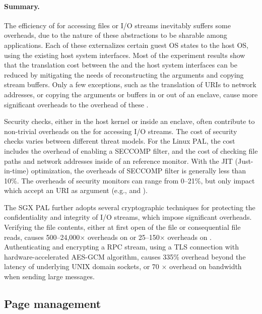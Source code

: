 \paragraph{Summary.}
The efficiency of \hostapis{} for accessing files or I/O streams
inevitably suffers some overheads,
due to the nature of these abstractions to be sharable
among applications.
Each of these \hostapis{} externalizes certain guest OS states
to the host OS,
using the existing host system interfaces.
Most of the experiment results
show that the translation cost between the \hostapis{} and the host system interfaces can be reduced
by mitigating the needs of reconstructing the \hostapi{} arguments
and copying stream buffers.
Only a few exceptions, such as the translation of URIs to network addresses,
or copying the arguments or buffers in or out of an enclave,
cause more significant overheads to the overhead of these \linuxapis{}.




Security checks, either in the host kernel or inside an enclave,
often contribute to
non-trivial overheads on the \hostapis{} for accessing I/O streams.
The cost of security checks
varies between different threat models.
For the Linux PAL, the cost includes the overhead of enabling a SECCOMP filter, and the cost of checking file paths and network addresses
inside of an reference monitor.
With the JIT (Just-in-time) optimization,
the overheads of SECCOMP filter is generally less than 10\%.
The overheads of security monitors can range from 0--21\%, but only impact \hostapis{} which accept an URI as argument (e.g.,  and ).

 
The SGX PAL further adopts several cryptographic techniques
for protecting the confidentiality and integrity of I/O streams, which impose significant overheads.
Verifying the file contents, either at first open of the file or consequential file reads,
causes 500--24,000$\times$ overheads on 
or 25--150$\times$ overheads on .
Authenticating and encrypting a RPC stream, using a TLS connection with hardware-accelerated AES-GCM algorithm,
causes \roughly{}335\% overhead beyond the latency of underlying UNIX domain sockets,
or \roughly{}70 $\times$ overhead on bandwidth when sending large messages.






\subsection{Page management}


